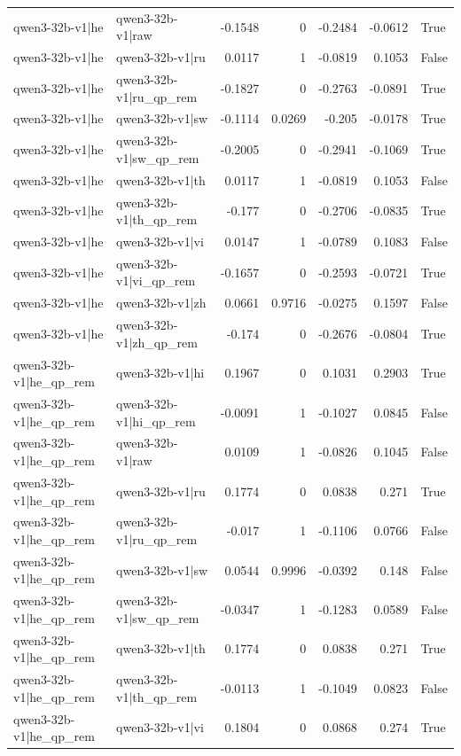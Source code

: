 \begin{table}
\begin{tabular}{l l r r r r l}
qwen3-32b-v1|he & qwen3-32b-v1|raw & -0.1548 & 0 & -0.2484 & -0.0612 & True \\
qwen3-32b-v1|he & qwen3-32b-v1|ru & 0.0117 & 1 & -0.0819 & 0.1053 & False \\
qwen3-32b-v1|he & qwen3-32b-v1|ru_qp_rem & -0.1827 & 0 & -0.2763 & -0.0891 & True \\
qwen3-32b-v1|he & qwen3-32b-v1|sw & -0.1114 & 0.0269 & -0.205 & -0.0178 & True \\
qwen3-32b-v1|he & qwen3-32b-v1|sw_qp_rem & -0.2005 & 0 & -0.2941 & -0.1069 & True \\
qwen3-32b-v1|he & qwen3-32b-v1|th & 0.0117 & 1 & -0.0819 & 0.1053 & False \\
qwen3-32b-v1|he & qwen3-32b-v1|th_qp_rem & -0.177 & 0 & -0.2706 & -0.0835 & True \\
qwen3-32b-v1|he & qwen3-32b-v1|vi & 0.0147 & 1 & -0.0789 & 0.1083 & False \\
qwen3-32b-v1|he & qwen3-32b-v1|vi_qp_rem & -0.1657 & 0 & -0.2593 & -0.0721 & True \\
qwen3-32b-v1|he & qwen3-32b-v1|zh & 0.0661 & 0.9716 & -0.0275 & 0.1597 & False \\
qwen3-32b-v1|he & qwen3-32b-v1|zh_qp_rem & -0.174 & 0 & -0.2676 & -0.0804 & True \\
qwen3-32b-v1|he_qp_rem & qwen3-32b-v1|hi & 0.1967 & 0 & 0.1031 & 0.2903 & True \\
qwen3-32b-v1|he_qp_rem & qwen3-32b-v1|hi_qp_rem & -0.0091 & 1 & -0.1027 & 0.0845 & False \\
qwen3-32b-v1|he_qp_rem & qwen3-32b-v1|raw & 0.0109 & 1 & -0.0826 & 0.1045 & False \\
qwen3-32b-v1|he_qp_rem & qwen3-32b-v1|ru & 0.1774 & 0 & 0.0838 & 0.271 & True \\
qwen3-32b-v1|he_qp_rem & qwen3-32b-v1|ru_qp_rem & -0.017 & 1 & -0.1106 & 0.0766 & False \\
qwen3-32b-v1|he_qp_rem & qwen3-32b-v1|sw & 0.0544 & 0.9996 & -0.0392 & 0.148 & False \\
qwen3-32b-v1|he_qp_rem & qwen3-32b-v1|sw_qp_rem & -0.0347 & 1 & -0.1283 & 0.0589 & False \\
qwen3-32b-v1|he_qp_rem & qwen3-32b-v1|th & 0.1774 & 0 & 0.0838 & 0.271 & True \\
qwen3-32b-v1|he_qp_rem & qwen3-32b-v1|th_qp_rem & -0.0113 & 1 & -0.1049 & 0.0823 & False \\
qwen3-32b-v1|he_qp_rem & qwen3-32b-v1|vi & 0.1804 & 0 & 0.0868 & 0.274 & True \\

\end{tabular}
\end{table}
